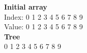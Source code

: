 \documentclass{article}
\begin{document}
\textbf{Initial array}\\
Index: \hspace{4pt}0 \hspace{4pt}1 \hspace{4pt}2 \hspace{4pt}3 \hspace{4pt}4 \hspace{4pt}5 \hspace{4pt}6 \hspace{4pt}7 \hspace{4pt}8 \hspace{4pt}9\\
Value: \hspace{4pt}0 \hspace{4pt}1 \hspace{4pt}2 \hspace{4pt}3 \hspace{4pt}4 \hspace{4pt}5 \hspace{4pt}6 \hspace{4pt}7 \hspace{4pt}8 \hspace{4pt}9\\
\textbf{Tree}\\
0 \hspace{4pt}1 \hspace{4pt}2 \hspace{4pt}3 \hspace{4pt}4 \hspace{4pt}5 \hspace{4pt}6 \hspace{4pt}7 \hspace{4pt}8 \hspace{4pt}9
\end{document}
